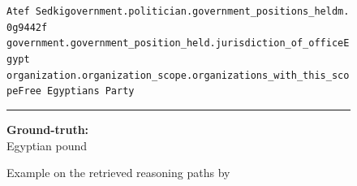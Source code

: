 \begin{figure}[t]
\begin{tcolorbox}[colback=gray!5!white,
                  colframe=gray!75!black,
                  title=CWQ-WebQTrn-105\_64489ea2de4b116070d33a0ebcfd4866]
{\texttt{Atef Sedki\patharrow government.politician.government\_positions\_held\patharrow m.0g9442f\patharrow \\ government.government\_position\_held.jurisdiction\_of\_office\patharrow Egypt\patharrow  \\ organization.organization\_scope.organizations\_with\_this\_scope\patharrow Free Egyptians Party}\\[6pt]

\par}

\rule{\linewidth}{0.4pt}

\textbf{Ground-truth:}\\
Egyptian pound

\end{tcolorbox}
\caption{Example on the retrieved reasoning paths by \proj}
\label{fig:example8}
\end{figure}

